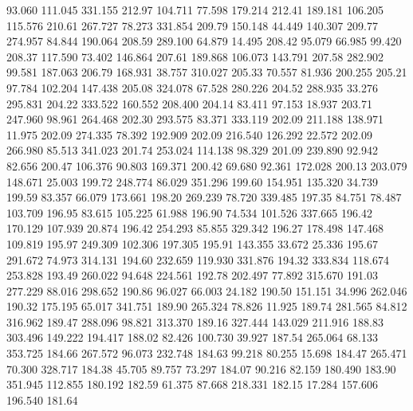   93.060  111.045  331.155       212.97
 104.711   77.598  179.214       212.41
 189.181  106.205  115.576       210.61
 267.727   78.273  331.854       209.79
 150.148   44.449  140.307       209.77
 274.957   84.844  190.064       208.59
 289.100   64.879   14.495       208.42
  95.079   66.985   99.420       208.37
 117.590   73.402  146.864       207.61
 189.868  106.073  143.791       207.58
 282.902   99.581  187.063       206.79
 168.931   38.757  310.027       205.33
  70.557   81.936  200.255       205.21
  97.784  102.204  147.438       205.08
 324.078   67.528  280.226       204.52
 288.935   33.276  295.831       204.22
 333.522  160.552  208.400       204.14
  83.411   97.153   18.937       203.71
 247.960   98.961  264.468       202.30
 293.575   83.371  333.119       202.09
 211.188  138.971   11.975       202.09
 274.335   78.392  192.909       202.09
 216.540  126.292   22.572       202.09
 266.980   85.513  341.023       201.74
 253.024  114.138   98.329       201.09
 239.890   92.942   82.656       200.47
 106.376   90.803  169.371       200.42
  69.680   92.361  172.028       200.13
 203.079  148.671   25.003       199.72
 248.774   86.029  351.296       199.60
 154.951  135.320   34.739       199.59
  83.357   66.079  173.661       198.20
 269.239   78.720  339.485       197.35
  84.751   78.487  103.709       196.95
  83.615  105.225   61.988       196.90
  74.534  101.526  337.665       196.42
 170.129  107.939   20.874       196.42
 254.293   85.855  329.342       196.27
 178.498  147.468  109.819       195.97
 249.309  102.306  197.305       195.91
 143.355   33.672   25.336       195.67
 291.672   74.973  314.131       194.60
 232.659  119.930  331.876       194.32
 333.834  118.674  253.828       193.49
 260.022   94.648  224.561       192.78
 202.497   77.892  315.670       191.03
 277.229   88.016  298.652       190.86
  96.027   66.003   24.182       190.50
 151.151   34.996  262.046       190.32
 175.195   65.017  341.751       189.90
 265.324   78.826   11.925       189.74
 281.565   84.812  316.962       189.47
 288.096   98.821  313.370       189.16
 327.444  143.029  211.916       188.83
 303.496  149.222  194.417       188.02
  82.426  100.730   39.927       187.54
 265.064   68.133  353.725       184.66
 267.572   96.073  232.748       184.63
  99.218   80.255   15.698       184.47
 265.471   70.300  328.717       184.38
  45.705   89.757   73.297       184.07
  90.216   82.159  180.490       183.90
 351.945  112.855  180.192       182.59
  61.375   87.668  218.331       182.15
  17.284  157.606  196.540       181.64
